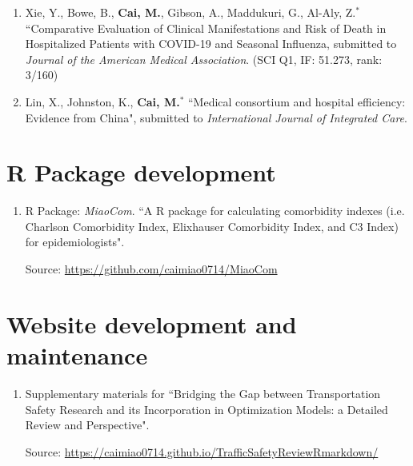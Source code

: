 \documentclass[11pt, a4paper]{article}
\newcommand{\years}[1]{\marginnote{\scriptsize #1}}
\begin{document}
\begin{enumerate}[leftmargin=0ex,itemsep=1ex]
		\item Xie, Y., Bowe, B., \textbf{Cai, M.}, Gibson, A., Maddukuri, G., Al-Aly, Z.$^\ast$ ``Comparative Evaluation of Clinical Manifestations and Risk of Death in Hospitalized Patients with COVID-19 and Seasonal Influenza, submitted to \emph{Journal of the American Medical Association}. (SCI Q1, IF: 51.273, rank: 3/160)
		
		\item Lin, X., Johnston, K., \textbf{Cai, M.}$^*$ ``Medical consortium and hospital efficiency: Evidence from China", submitted to \emph{International Journal of Integrated Care}.
	\end{enumerate}
	
	
	
	\section*{R Package development}
	\begin{enumerate}[leftmargin=0ex,itemsep=1ex]
	\item R Package: \emph{MiaoCom}. ``A R package for calculating comorbidity indexes (i.e. Charlson Comorbidity Index, Elixhauser Comorbidity Index, and C3 Index) for epidemiologists". 

	Source: \href{https://github.com/caimiao0714/MiaoCom}{https://github.com/caimiao0714/MiaoCom}
	\end{enumerate}
	
	\section*{Website development and maintenance}
	\begin{enumerate}[leftmargin=0ex,itemsep=1ex]
		\item Supplementary materials for ``Bridging the Gap between Transportation Safety Research and its Incorporation in Optimization Models: a Detailed Review and Perspective". 
		
		Source:  \href{https://caimiao0714.github.io/TrafficSafetyReviewRmarkdown/}{https://caimiao0714.github.io/TrafficSafetyReviewRmarkdown/}
	\end{enumerate}
	
\end{document}
